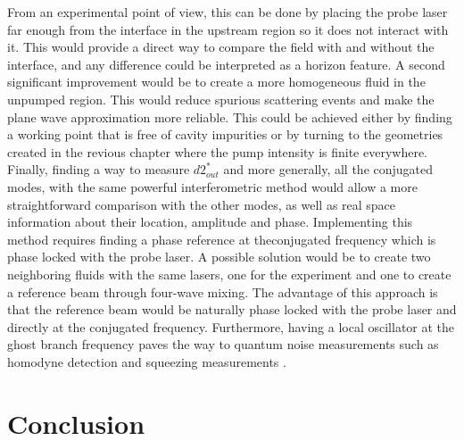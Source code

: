 From an experimental point of view, this can be done by placing the probe laser far enough from the interface in the upstream region so it does not interact with it. This would provide
a direct way to compare the field with and without the interface, and any difference could be interpreted as a horizon feature. A second significant 
improvement would be to create a more homogeneous fluid in the unpumped region. This would reduce spurious scattering events and make the plane wave approximation more reliable.
This could be achieved either by finding a working point that is free of cavity impurities or by turning to the geometries created in the revious chapter where the pump intensity is finite everywhere.
Finally, finding a way to measure $d2_{out}^*$ and more generally, all the conjugated modes, with the same powerful interferometric method would allow a more straightforward comparison with the other modes, as well as real space information about their location, amplitude and phase. Implementing this method requires finding a phase reference at theconjugated frequency which is phase locked with the probe laser. A possible solution would be to create two neighboring fluids with the same lasers, one for the experiment and one to create a reference beam through four-wave mixing. The advantage of this approach is that the reference beam would be naturally phase locked with the probe laser and directly at the conjugated frequency.
Furthermore, having a local oscillator at the ghost branch frequency paves the way to quantum noise measurements such as homodyne detection and squeezing measurements \cite{agullo_symplectic_2022}.



\section{Conclusion}
\label{sec:conclusion}


